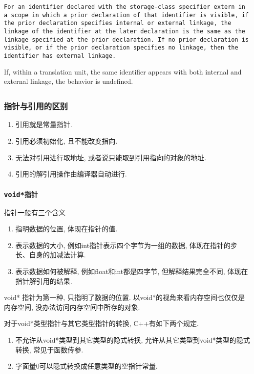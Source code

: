 {\tt For an identifier declared with the storage-class specifier extern in a scope 
in which a prior declaration of that identifier is visible, if the prior 
declaration specifies internal or external linkage, the linkage of the 
identifier at the later declaration is the same as the linkage specified 
at the prior declaration. If no prior declaration is visible, or if the 
prior declaration specifies no linkage, then the identifier has external 
linkage.

If, within a translation unit, the same identifier appears with both internal 
and external linkage, the behavior is undefined.}

\subsection[指针与引用]{\color{purple}{指针与引用}}
\subsubsection{指针与引用的区别}
\begin{enumerate}
	\item 引用就是常量指针.
	\item 引用必须初始化, 且不能改变指向.
	\item 无法对引用进行取地址, 或者说只能取到引用指向的对象的地址.
	\item 引用的解引用操作由编译器自动进行.
\end{enumerate}
\subsubsection{\tt{void*}指针}
指针一般有三个含义
\begin{enumerate}
	\item 指明数据的位置, 体现在指针的值.
	\item 表示数据的大小, 例如int指针表示四个字节为一组的数据, 体现在指针的步长、自身的加减法计算.
	\item 表示数据如何被解释, 例如float和int都是四字节, 但解释结果完全不同, 体现在指针解引用的结果.
\end{enumerate}

void* 指针为第一种, 只指明了数据的位置. 以void*的视角来看内存空间也仅仅是内存空间, 没办法访问内存空间中所存的对象.

对于void*类型指针与其它类型指针的转换, C++有如下两个规定.
\begin{enumerate}
	\item 不允许从void*类型到其它类型的隐式转换, 允许从其它类型到void*类型的隐式转换, 常见于函数传参.
	\item 字面量0可以隐式转换成任意类型的空指针常量.
\end{enumerate}

